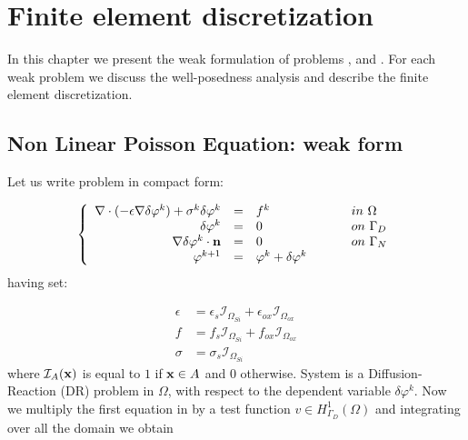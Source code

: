 \chapter{Finite element discretization}
\label{chap: finite element}

In this chapter we present the weak formulation of problems ,  and . For each weak problem we discuss the well-posedness analysis and describe the finite element discretization. 


\section{Non Linear Poisson Equation: weak form}
\label{sec: NLP weak form}

Let us write problem  in compact form:

\begin{equation}
\label{sys: NLP general problem linearized}
\left\{
\begin{array}{rcll}
\nabla \cdot (-\epsilon \nabla \delta \varphi^k) + \sigma^k \delta \varphi^k & = &  f^k & \psp{15} in \psp{2} \Omega \\
\delta \varphi^k & = & 0 & \psp{15} on \psp{2} \Gamma_D \\
\nabla \delta \varphi ^k\cdot \vect{n} & = & 0 & \psp{15} on \psp{2} \Gamma_N
\\
\varphi^{k+1} & = & \varphi^k + \delta \varphi^k
\end{array}
\right.
\end{equation}
having set:

\begin{align*}
\epsilon & = \epsilon_s \mathcal{I}_{\Omega_{Si}} + \epsilon_{ox} \mathcal{I}_{\Omega_{ox}} \\
f & = f_s \mathcal{I}_{\Omega_{Si}} + f_{ox} \mathcal{I}_{\Omega_{ox}} \\
\sigma & = \sigma_s \mathcal{I}_{\Omega_{Si}}
\end{align*}
where $\mathcal{I}_A(\mathbf{x})$ is equal to $1$ if $\mathbf{x}\in A$ and $0$ otherwise.
System  is a Diffusion-Reaction (DR) problem in $\Omega$, with respect to the dependent variable $\delta \varphi^k$. 
Now we multiply the first equation in  by a test function $v \in H^1_{\Gamma_D}(\Omega)$ and integrating over all the domain we obtain

